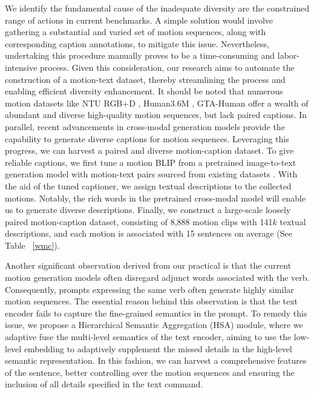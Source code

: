 \documentclass[letterpaper]{article} \usepackage{aaai24}
\begin{document}
We identify the fundamental cause of the inadequate diversity are the constrained range of actions in current benchmarks.
A simple solution would involve gathering a substantial and varied set of motion sequences, along with corresponding caption annotations, to mitigate this issue.
Nevertheless, undertaking this procedure manually proves to be a time-consuming and labor-intensive process. Given this consideration, our research aims to automate the construction of a motion-text dataset, thereby streamlining the process and enabling efficient diversity enhancement. It should be noted that numerous motion datasets like NTU RGB+D \cite{shahroudy2016ntu}, Human3.6M \cite{h36m_pami}, GTA-Human \cite{cai2021playing} offer a wealth of abundant and diverse high-quality motion sequences, but lack paired captions. In parallel, recent advancements in cross-modal generation models provide the capability to generate diverse captions for motion sequences. Leveraging this progress, we can harvest a paired and diverse motion-caption dataset. To give reliable captions, we first tune a motion BLIP from a pretrained image-to-text generation model with motion-text pairs sourced from existing datasets \cite{guo2022generating,Plappert_2016}. With the aid of the tuned captioner, we assign textual descriptions to the collected motions.  Notably, the rich words in the pretrained cross-modal model will enable us to generate diverse descriptions.
Finally, we construct a large-scale loosely paired motion-caption dataset, consisting of 8,888 motion clips with 141$k$ textual descriptions, and each motion is associated with 15 sentences on average (See Table ~\ref{wmc}).


Another significant observation derived from our practical is that the current motion generation models often disregard adjunct words associated with the verb. Consequently, prompts expressing the same verb often generate highly similar motion sequences. The essential reason behind this observation is that the text encoder fails to capture the fine-grained semantics in the prompt. To remedy this issue, we propose a Hierarchical Semantic Aggregation (HSA) module, where we adaptive fuse the multi-level semantics of the text encoder, aiming to use the low-level embedding to adaptively supplement the missed details in the high-level semantic representation. In this fashion, we can harvest a comprehensive features of the sentence,  better controlling over the motion sequences and ensuring the inclusion of all details specified in the text command.
\end{document}
